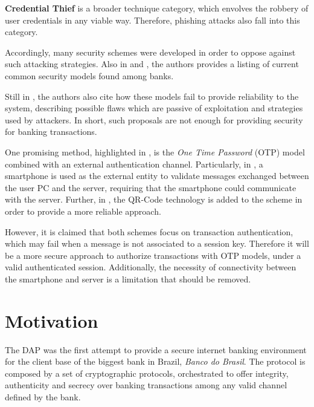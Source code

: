\textbf{Credential Thief} is a broader technique category, which envolves the robbery of user credentials in any viable way. Therefore, phishing attacks also fall into this category.

Accordingly, many security schemes were developed in order to oppose against such attacking strategies. Also in \cite{Peotta2011} and \cite{Adham2013}, the authors provides a listing of current common security models found among banks.

Still in \cite{Peotta2011, Adham2013}, the authors also cite how these models fail to provide reliability to the system, describing possible flaws which are passive of exploitation and strategies used by attackers. In short, such proposals are not enough for providing security for banking transactions.

One promising method, highlighted in \cite[p.61]{Peotta2012}, is the \textit{One Time Password} (OTP) model combined with an external authentication channel. Particularly, in \cite{Starnberger2009}, a smartphone is used as the external entity to validate messages exchanged between the user PC and the server, requiring that the smartphone could communicate with the server. Further, in \cite{LeeHyunLim2010}, the QR-Code technology is added to the scheme in order to provide a more reliable approach.

However, it is claimed that both schemes focus on transaction authentication, which may fail when a message is not associated to a session key. Therefore it will be a more secure approach to authorize transactions with OTP models, under a valid authenticated session. Additionally, the necessity of connectivity between the smartphone and server is a limitation that should be removed.














\section{Motivation}
The DAP was the first attempt to provide a secure internet banking environment for the client base of the biggest bank in Brazil, \textit{Banco do Brasil}. The protocol is composed by a set of cryptographic protocols, orchestrated to offer integrity, authenticity and secrecy over banking transactions among any valid channel defined by the bank.

